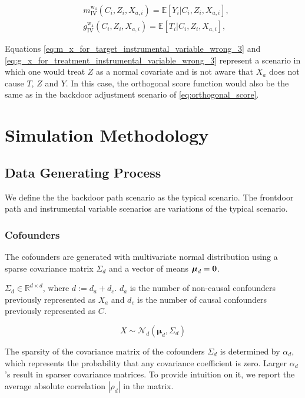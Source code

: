 \documentclass{article}
\numberwithin{equation}{section}
\begin{document}
\begin{align}
    & m_{\text{IV}}^{\text{w}_4}(C_i, Z_i, X_{a, i}) = \mathbb{E}[Y_i | C_i, Z_i, X_{a, i}],
    \label{eq:m_x_for_target_instrumental_variable_wrong_3}
    \\
    & g_{\text{IV}}^{\text{w}_4}(C_i, Z_i, X_{a, i}) = \mathbb{E}[T_i | C_i, Z_i, X_{a, i}],
    \label{eq:g_x_for_treatment_instrumental_variable_wrong_3}
\end{align}

Equations \eqref{eq:m_x_for_target_instrumental_variable_wrong_3} and \eqref{eq:g_x_for_treatment_instrumental_variable_wrong_3} represent a scenario in which one would treat $Z$ as a normal covariate and is not aware that $X_a$ does not cause $T$, $Z$ and $Y$. In this case, the orthogonal score function would also be the same as in the backdoor adjustment scenario of \eqref{eq:orthogonal_score}.

\section{Simulation Methodology}

\subsection{Data Generating Process}

We define the the backdoor path scenario as the typical scenario. The frontdoor path and instrumental variable scenarios are variations of the typical scenario.

\subsubsection{Cofounders}

The cofounders are generated with multivariate normal distribution using a sparse covariance matrix $\Sigma_d$ and a vector of means $\boldsymbol{\mu}_d = \bf{0}$.

$\Sigma_d \in \mathbb{R}^{d \times d}$, where $d := d_a + d_c$. $d_a$ is the number of non-causal confounders previously represented as $X_a$ and $d_c$ is the number of causal confounders previously represented as $C$.

\begin{equation}
    \label{eq:cofounders_data_generating_process}
    X \sim \mathcal{N}_d(\boldsymbol{\mu}_d, \Sigma_d)
\end{equation}

The sparsity of the covariance matrix of the cofounders $\Sigma_d$ is determined by $\alpha_d$, which represents the probability that any covariance coefficient is zero. Larger $\alpha_d$'s result in sparser covariance matrices. To provide intuition on it, we report the average absolute correlation ${|\rho_d|}$ in the matrix.
\end{document}
